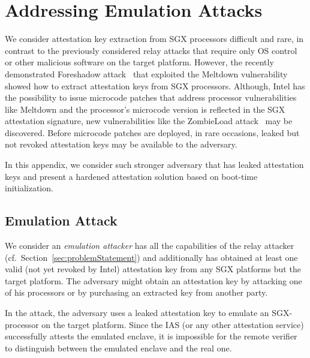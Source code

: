 

\section{Addressing Emulation Attacks}
\label{sec:variantII}

We consider attestation key extraction from SGX processors difficult and rare, in contrast to the previously considered relay attacks that require only OS control or other malicious software on the target platform. However, the recently demonstrated Foreshadow attack~\cite{foreshadow-usenix18} that exploited the Meltdown vulnerability~\cite{Lipp2018meltdown} showed how to extract attestation keys from SGX processors. Although, Intel has the possibility to issue microcode patches that address processor vulnerabilities like Meltdown and the processor's microcode version is reflected in the SGX attestation signature, new vulnerabilities like the ZombieLoad attack~\cite{ZombieLoad} may be discovered. Before microcode patches are deployed, in rare occasions, leaked but not revoked attestation keys may be available to the adversary.

In this appendix, we consider such stronger adversary that has leaked attestation keys and present a hardened attestation solution based on boot-time initialization.

\subsection{Emulation Attack} 

 We consider an \emph{emulation attacker} has all the capabilities of the relay attacker (cf.\ Section~\ref{sec:problemStatement}) and additionally has obtained at least one valid (not yet revoked by Intel) attestation key from any SGX platforms but the target platform. The adversary might obtain an attestation key by attacking one of his processors or by purchasing an extracted key from another party. 

In the attack, the adversary uses a leaked attestation key to emulate an SGX-processor on the target platform. 
Since the IAS (or any other attestation service) successfully attests the emulated enclave, it is impossible for the remote verifier to distinguish between the emulated enclave and the real one. 


